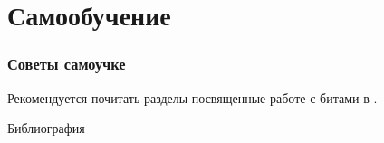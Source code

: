 \section{Самообучение}

\begin{frame}
    \frametitle{Советы самоучке}
    
    Рекомендуется почитать разделы посвященные работе с битами в \cite{bib:warren:algTriks}.
\end{frame}

\begin{frame}[allowframebreaks]{Библиография}
    
    
\end{frame}

